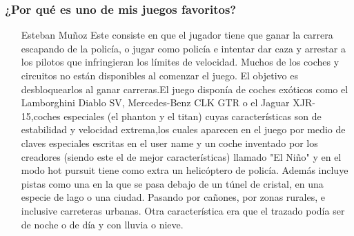 \subsubsection{¿Por qué es uno de mis juegos favoritos?}
\begin{itemize}
\item[Esteban Muñoz]Este consiste en que el jugador tiene que ganar la carrera escapando de la      policía, o jugar como policía e intentar dar caza y arrestar a los pilotos que infringieran los límites de velocidad. Muchos de los coches y circuitos no están disponibles al comenzar el juego. El objetivo es desbloquearlos al ganar carreras.El juego disponía de coches exóticos como el Lamborghini Diablo SV, Mercedes-Benz CLK GTR o el Jaguar XJR-15,coches especiales (el phanton y el titan) cuyas características son de estabilidad y velocidad extrema,los cuales aparecen en el juego por medio de claves especiales escritas en el user name y un coche inventado por los creadores (siendo este el de mejor características) llamado "El Niño" y en el modo hot pursuit tiene como extra un helicóptero de policía. Además incluye pistas como una en la que se pasa debajo de un túnel de cristal, en una especie de lago o una ciudad. Pasando por cañones, por zonas rurales, e inclusive carreteras urbanas. Otra característica era que el trazado podía ser de noche o de día y con lluvia o nieve.
\end{itemize}
